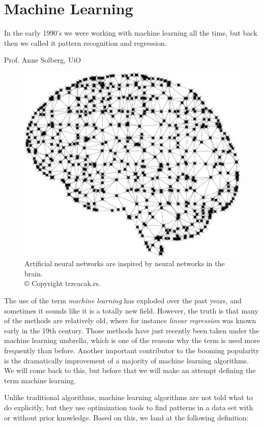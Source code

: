 \chapter{Machine Learning} \label{chp:machinelearning}
\epigraph{In the early 1990's we were working with machine learning all the time, but back then we called it pattern recognition and regression.}{Prof. Anne Solberg, UiO}
\begin{figure}[H]
	\centering
	\includegraphics[scale=0.25]{Images/brain.png}
	\caption{Artificial neural networks are inspired by neural networks in the brain.\\ © Copyright trzcacak.rs.}
\end{figure}

The use of the term \textit{machine learning} has exploded over the past years, and sometimes it sounds like it is a totally new field. However, the truth is that many of the methods are relatively old, where for instance \textit{linear regression} was known early in the 19th century. \cite{legendre_nouvelles_1805, gauss_theoria_1809} Those methods have just recently been taken under the machine learning umbrella, which is one of the reasons why the term is used more frequently than before. Another important contributor to the booming popularity is the dramatically improvement of a majority of machine learning algorithms. We will come back to this, but before that we will make an attempt defining the term machine learning.

Unlike traditional algorithms, machine learning algorithms are not told what to do explicitly, but they use optimization tools to find patterns in a data set with or without prior knowledge. Based on this, we land at the following definition:

